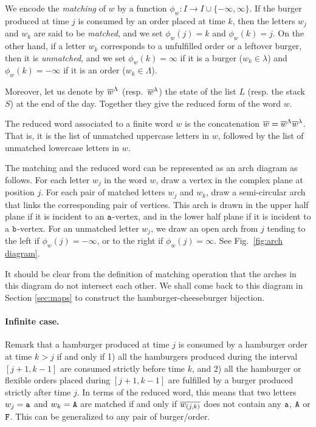\documentclass[a4paper]{article}
\begin{document}
We encode the \emph{matching} of $w$ by a function $\phi_w:I\to I\cup\{-\infty,\infty\}$.
If the burger produced at time $j$ is consumed by an order placed at time $k$, then the letters $w_j$ and $w_k$ are said to be \emph{matched}, and we set $\phi_w(j)=k$ and $\phi_w(k)=j$.
On the other hand, if a letter $w_k$ corresponds to a unfulfilled order or a leftover burger, then it is \emph{unmatched}, and we set $\phi_w(k)=\infty$ if it is a burger ($w_k\in \lambda$) and $\phi_w(k)=-\infty$ if it is an order ($w_k \in \Lambda$).

Moreover, let us denote by $\overline{w}^\Lambda$ (resp.\ $\overline{w}^\lambda$) the state of the list $L$ (resp. the stack $S$) at the end of the day.
Together they give the reduced form of the word $w$.

\begin{definition}\label{def:reduced word}
The reduced word associated to a finite word $w$ is the concatenation $\overline{w} = \overline{w}^\Lambda\overline{w}^\lambda$.
That is, it is the list of unmatched uppercase letters in $w$, followed by the list of unmatched lowercase letters in $w$.
\end{definition}

The matching and the reduced word can be represented as an arch diagram as follows.
For each letter $w_j$ in the word $w$, draw a vertex in the complex plane at position $j$.
For each pair of matched letters $w_j$ and $w_k$, draw a semi-circular arch that links the corresponding pair of vertices.
This arch is drawn in the upper half plane if it is incident to an $\mathtt{a}$-vertex, and in the lower half plane if it is incident to a $\mathtt{b}$-vertex.
For an unmatched letter $w_j$, we draw an open arch from $j$ tending to the left if $\phi_w(j)=-\infty$, or to the right if $\phi_w(j)=\infty$.
See Fig.~\ref{fig:arch diagram}.

It should be clear from the definition of matching operation that the arches in this diagram do not intersect each other.
We shall come back to this diagram in Section \ref{sec:maps} to construct the hamburger-cheeseburger bijection.

\paragraph{Infinite case.}
Remark that a hamburger produced at time $j$ is consumed by a hamburger order at time $k>j$ if and only if 1) all the hamburgers produced during the interval $[j+1,k-1]$ are consumed strictly before time $k$, and 2) all the hamburger or flexible orders placed during $[j+1,k-1]$ are fulfilled by a burger produced strictly after time $j$.
In terms of the reduced word, this means that two letters $w_j=\mathtt{a}$ and $w_k=\mathtt{A}$ are matched if and only if $\overline{w_{(j,k)}}$ does not contain any $\mathtt{a}$, $\mathtt{A}$ or $\mathtt{F}$.
This can be generalized to any pair of burger/order.
\end{document}
